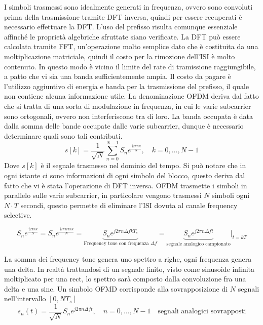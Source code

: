 


I simboli trasmessi sono idealmente generati in frequenza, ovvero sono convoluti prima della trasmissione tramite DFT inversa, quindi per essere recuperati è necessario effettuare la DFT. L'uso del prefisso risulta comunque essenziale affinché le proprietà algebriche sfruttate siano verificate. 
La DFT può essere calcolata tramite FFT, un'operazione molto semplice dato che è costituita da una moltiplicazione matriciale, quindi il costo per la rimozione dell'ISI è molto contenuto. In questo modo è vicino il limite del rate di tramissione raggiungibile, a patto che vi sia una banda sufficientemente ampia.
Il costo da pagare è l'utilizzo aggiuntivo di energia e banda per la trasmissione del prefisso, il quale non contiene alcuna informazione utile.
La denominazione OFDM deriva dal fatto che si tratta di una sorta di modulazione in frequenza, in cui le varie subcarrier sono ortogonali, ovvero non interferiscono tra di loro. 
La banda occupata è data dalla somma delle bande occupate dalle varie subcarrier, dunque è necessario determinare quali sono tali contributi.
\[
    s[k] = \frac{1}{\sqrt{N}} \sum_{n=0}^{N-1} S_n e^{\frac{j2\pi nk}{N}}, \quad k = 0, \ldots, N-1
\]
Dove $s[k]$ è il segnale trasmesso nel dominio del tempo. Si può notare che in ogni istante ci sono informazioni di ogni simbolo del blocco, questo deriva dal fatto che vi è stata l'operazione di DFT inversa. OFDM trasmette i simboli in parallelo sulle varie subcarrier, in particolare vengono trasmessi $N$ simboli ogni $N \cdot T$ secondi, questo permette di eliminare l'ISI dovuta al canale frequency selective. 

\[
    S_n e^{\frac{j2\pi nk}{N}} = S_n e^{\frac{j2\pi BTnk}{N}} = \underbrace{S_n e^{j2\pi n\Delta f k T_s}}_{\text{Frequency tone con frequenza $\Delta f$}} = \underbrace{S_n e^{j 2 \pi n \Delta f t}}_{\text{segnale analogico campionato}} \bigg|_{t=kT}
\]




La somma dei frequency tone genera uno spettro a righe, ogni frequenza genera una delta. In realtà trattandosi di un segnale finito, visto come sinusoide infinita moltiplicato per una rect, lo spettro sarà composto dalla convoluzione fra una delta e una sinc.
Un simbolo OFMD corrisponde alla sovrapposizione di $N$ segnali nell'intervallo $[0, NT_s]$
\[
    s_n(t) = \frac{1}{\sqrt{N}} S_n e^{j2\pi n \Delta f t}, \quad n = 0, \ldots, N-1 \quad \text{segnali analogici sovrapposti}
\]

